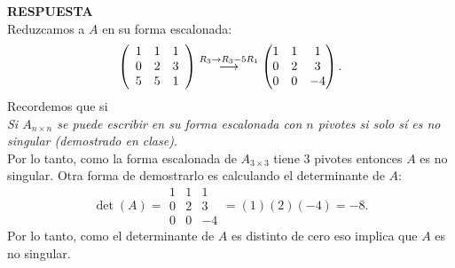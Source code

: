 \documentclass[11pt,letterpaper]{article}
\newcommand{\res}{\textbf{RESPUESTA}\\}
\newcommand{\grstep}[2][\relax]{%
   \ensuremath{\mathrel{
       {\mathop{\longrightarrow}\limits^{#2\mathstrut}_{
                                     \begin{subarray}{l} #1 \end{subarray}}}}}}
\begin{document}
\begin{enumerate}
\res
Reduzcamos a $A$ en su forma escalonada:
\begin{equation*}
\left(\begin{array}{rrr}
 1 & 1 & 1\\
 0 & 2 & 3\\
 5 & 5 & 1
\end{array}\right) %
\grstep[]{R_3 \rightarrow R_3-5R_1}
%
\begin{pmatrix}
 1 & 1 & 1\\
 0 & 2 & 3\\
 0 & 0 & -4
\end{pmatrix}.
\end{equation*}
Recordemos que si\\
\textit{Si $A_{n\times n}$ se puede escribir en su forma escalonada con $n$ pivotes si solo sí es no singular (demostrado en clase).} \\
Por lo tanto, como la forma escalonada de $A_{3\times 3}$ tiene 3 pivotes entonces $A$ es no singular. Otra forma de demostrarlo es calculando el determinante de $A$:
$$ \det(A)=\begin{array}{|rrr|}
 1 & 1 & 1\\
 0 & 2 & 3\\
 0 & 0 & -4
\end{array}=(1)(2)(-4)=-8.$$
Por lo tanto, como el determinante de $A$ es distinto de cero eso implica que $A$ es no singular. 


\end{enumerate}
\end{document}
